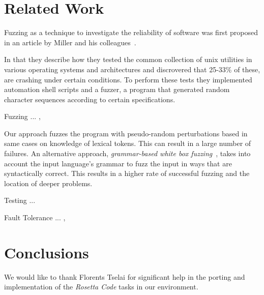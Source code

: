 \documentclass[10pt]{sigplanconf}
\begin{document}
\section{Related Work} %
\label{sec:related}

Fuzzing as a technique to investigate the reliability of software
was first proposed in an article by Miller and his colleagues~\cite{MFS90}.

In that they describe how they tested the common collection of {\sc unix}
utilities in various operating systems and architectures and discrovered that
25-33\% of these, are crashing under certain conditions. To perform these tests
they implemented automation shell scripts and a fuzzer, a program that generated
random character sequences according to certain specifications.

Fuzzing ... \cite{TJC08}, \cite{WWGZ11}

Our approach fuzzes the program with pseudo-random
perturbations based in same cases on knowledge of
lexical tokens.
This can result in a large number of failures.
An alternative approach, {\em grammar-based white box fuzzing}~\cite{God08},
takes into account the input language's grammar to fuzz the input in
ways that are syntactically correct.
This results in a higher rate of successful fuzzing and the location
of deeper problems.

Testing ... \cite{HAM06}

Fault Tolerance ... \cite{KOKR07}, \cite{LYU95}

\section{Conclusions} %
\label{sec:conclusions}


\acks

We would like to thank Florents Tselai for significant
help in the porting and implementation of the
{\em Rosetta Code} tasks in our environment.









\end{document}
